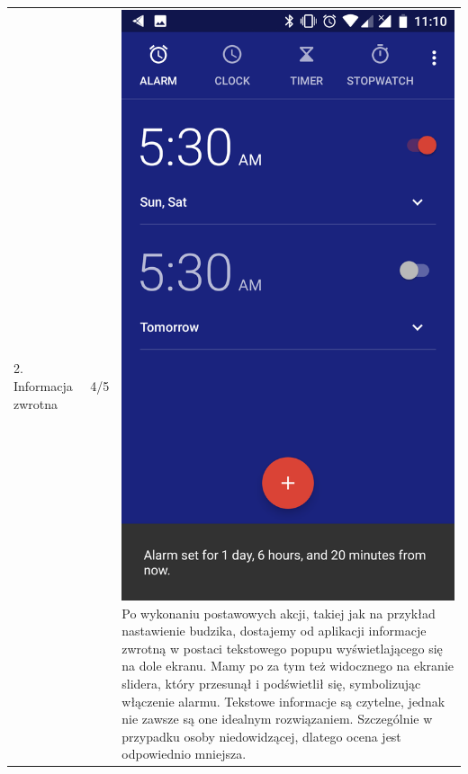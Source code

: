\documentclass[12pt]{article}
\begin{document}
\begin{longtable}{|p{}|p{}|p{}|}
        \hline
        2. Informacja zwrotna & 4/5 & \includegraphics[scale=0.1]{alarmset.png} Po wykonaniu postawowych akcji, takiej jak na przykład nastawienie budzika, dostajemy od aplikacji informacje zwrotną w postaci tekstowego popupu wyświetlającego się na dole ekranu. Mamy po za tym też widocznego na ekranie slidera, który przesunął i podświetlił się, symbolizując włączenie alarmu. Tekstowe informacje są czytelne, jednak nie zawsze są one idealnym rozwiązaniem. Szczególnie w przypadku osoby niedowidzącej, dlatego ocena jest odpowiednio mniejsza.\\

\end{longtable}
\end{document}
